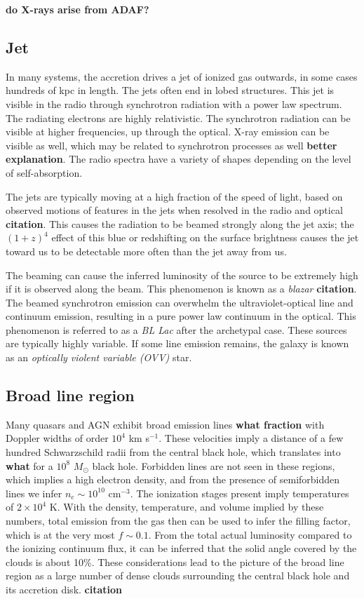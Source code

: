 {\bf do X-rays arise from ADAF?}

\subsection{Jet}

In many systems, the accretion drives a jet of ionized gas outwards,
in some cases hundreds of kpc in length.  The jets often end in lobed
structures.  This jet is visible in the radio through synchrotron
radiation with a power law spectrum. The radiating electrons are
highly relativistic. The synchrotron radiation can be visible at
higher frequencies, up through the optical. X-ray emission can be
visible as well, which may be related to synchrotron processes as well
{\bf better explanation}. The radio spectra have a variety of shapes
depending on the level of self-absorption.

The jets are typically moving at a high fraction of the speed of
light, based on observed motions of features in the jets when resolved
in the radio and optical {\bf citation}. This causes the radiation to
be beamed strongly along the jet axis; the $(1+z)^4$ effect of this
blue or redshifting on the surface brightness causes the jet toward us
to be detectable more often than the jet away from us.

The beaming can cause the inferred luminosity of the source to be
extremely high if it is observed along the beam. This phenomenon is
known as a {\it blazar} {\bf citation}. The beamed synchrotron
emission can overwhelm the ultraviolet-optical line and continuum
emission, resulting in a pure power law continuum in the optical. This
phenomenon is referred to as a {\it BL Lac} after the archetypal
case. These sources are typically highly variable. If some line
emission remains, the galaxy is known as an {\it optically violent
variable (OVV)} star.

\subsection{Broad line region}

Many quasars and AGN exhibit broad emission lines {\bf what fraction}
with Doppler widths of order $10^4$ km s$^{-1}$. These velocities
imply a distance of a few hundred Schwarzschild radii from the central
black hole, which translates into {\bf what} for a $10^8$ $M_\odot$
black hole. Forbidden lines are not seen in these regions, which
implies a high electron density, and from the presence of
semiforbidden lines we infer $n_e \sim 10^{10}$ cm$^{-3}$. The
ionization stages present imply temperatures of $2\times 10^4$ K. With
the density, temperature, and volume implied by these numbers, total
emission from the gas then can be used to infer the filling factor,
which is at the very most $f\sim 0.1$. From the total actual
luminosity compared to the ionizing continuum flux, it can be inferred
that the solid angle covered by the clouds is about 10\%. These
considerations lead to the picture of the broad line region as a large
number of dense clouds surrounding the central black hole and its
accretion disk. {\bf citation}


